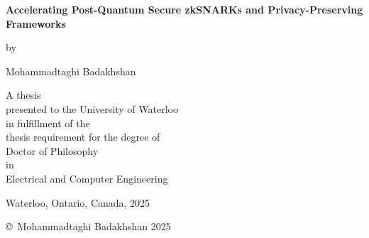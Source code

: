 \pagestyle{empty}

\begin{titlepage}
        \begin{center}
        \vspace*{1.0cm}

        \Huge
        {\bf Accelerating Post-Quantum Secure zkSNARKs and Privacy-Preserving Frameworks}


        \vspace*{1.0cm}

        \normalsize
        by \\

        \vspace*{1.0cm}

        \Large
        Mohammadtaghi Badakhshan \\

        \vspace*{2.5cm}

        \normalsize
        A thesis \\
        presented to the University of Waterloo \\ 
        in fulfillment of the \\
        thesis requirement for the degree of \\
        Doctor of Philosophy \\
        in \\
        Electrical and Computer Engineering \\

        \vspace*{2cm}

        Waterloo, Ontario, Canada, 2025 \\

        \vspace*{1.5cm}

        \copyright\ Mohammadtaghi Badakhshan 2025 \\
        \end{center}
\end{titlepage}

